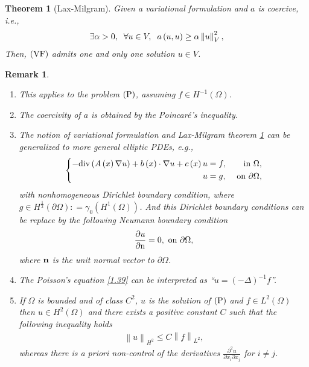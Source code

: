 \documentclass[11pt,a4paper,center,notitlepage]{article}
\numberwithin{equation}{section}
\newtheorem{theorem}{Theorem}[section]
\newtheorem{remark}{Remark}[section]
\begin{document}
\begin{theorem}[Lax-Milgram]\label{laxmilgram}
Given a variational formulation and $a$ is coercive, i.e., 
\begin{align}
\exists \alpha  > 0, \hspace{2mm}\forall u \in V, \hspace{2mm}a\left( {u,u} \right) \ge \alpha \left\| u \right\|_V^2,
\end{align}
Then, $\left( {\rm VF} \right)$ admits one and only one solution $u\in V$.
\end{theorem}

\begin{remark}
\begin{enumerate}
\item This applies to the problem $\left( {\rm P}\right)$, assuming $f\in H^{-1}\left(\Omega\right)$.
\item The coercivity of $a$ is obtained by the Poincar\'e's inequality.
\item The notion of variational formulation and Lax-Milgram theorem \ref{laxmilgram} can be generalized to more general elliptic PDEs, e.g.,
\begin{equation}
\left\{ \begin{split}
 - {\rm div}\left( {A\left( x \right)\nabla u} \right) + b\left( x \right) \cdot \nabla u + c\left( x \right)u &= f, & \mbox{ in } \Omega ,\\
u &= g, & \mbox{ on }\partial \Omega ,
\end{split} \right.
\end{equation}
with nonhomogeneous Dirichlet boundary condition, where $g \in {H^{\frac{1}{2}}}\left( {\partial \Omega } \right): = {\gamma _0}\left( {{H^1}\left( \Omega  \right)} \right)$. And this Dirichlet boundary conditions can be replace by the following Neumann boundary condition
\begin{align}
\frac{{\partial u}}{{\partial {\rm n}}} = 0,\mbox{ on }\partial \Omega ,
\end{align}
where $\bf n$ is the unit normal vector to $\partial \Omega$.
\item The Poisson's equation \eqref{1.39} can be interpreted as ``$u = {\left( { - \Delta } \right)^{ - 1}}f$''.
\item If $\Omega$ is bounded and of class $C^2$, $u$ is the solution of $\left( {\rm P}\right)$ and $f\in L^2\left(\Omega\right)$ then $u\in H^2\left(\Omega\right)$ and there exists a positive constant $C$ such that the following inequality holds
\begin{align}
{\left\| u \right\|_{{H^2}}} \le C{\left\| f \right\|_{{L^2}}},
\end{align}
whereas there is a priori non-control of the derivatives $\frac{{{\partial ^2}u}}{{\partial {x_i}\partial {x_j}}}$ for $i\ne j$.
\end{enumerate}
\end{remark}
\end{document}
